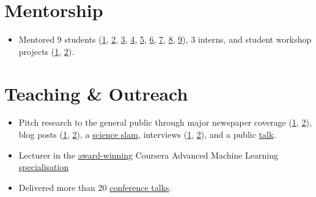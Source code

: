 \documentclass[11pt,a4paper]{article}
\begin{document}
\section{Mentorship}
\begin{itemize}
  \item Mentored 9 students (\href{https://www.hse.ru/edu/vkr/219430466}{1}, \href{https://www.hse.ru/edu/vkr/296294066}{2}, \href{https://www.hse.ru/edu/vkr/219524130}{3}, \href{https://www.hse.ru/en/edu/vkr/470561417}{4}, \href{https://www.hse.ru/en/edu/vkr/470935224}{5}, \href{https://www.hse.ru/ma/datasci/students/diplomas/631565328}{6}, \href{https://www.hse.ru/ma/datasci/students/diplomas/631565422}{7}, \href{https://www.hse.ru/edu/vkr/624890096}{8}, \href{https://www.hse.ru/ba/ami/students/diplomas/834351454}{9}), 3 interns, and student workshop projects (\href{https://sochisirius.ru/news/3148}{1}, \href{https://web.archive.org/web/20220512040654/https://academy.yandex.ru/posts/vossozdat-arkhitekturu-bazy-dannykh-i-nauchit-golosovogo-pomoschnika-predskazyvat-namereniya-polzovatelya}{2}).
\end{itemize}
\section{Teaching \& Outreach}
\begin{itemize}
  \item Pitch research to the general public through major newspaper coverage (\href{https://www.kommersant.ru/doc/7832307}{1}, \href{https://www.kommersant.ru/doc/6122817}{2}), blog posts (\href{https://ifim.nus.edu.sg/tailor-made-2d-materials-became-closer-with-the-new-machine-learning-algorithm-developed-at-nus/}{1}, \href{https://communities.springernature.com/posts/sparse-representation-for-machine-learning-the-properties-of-defects-in-2d-materials}{2}), a \href{https://elementy.ru/events/435506/IV\_Nauchnye\_boi\_NIU\_VShE\_na\_Dne\_Vyshki}{science slam}, interviews (\href{https://web.archive.org/web/20210518043835/https://academy.yandex.ru/posts/beresh-i-razbiraeshsya}{1}, \href{https://habr.com/en/company/yandex/blog/422761/}{2}), and a public \href{https://www.youtube.com/watch?v=zLFZ\_z-7-JI&feature=youtu.be&t=7779}{talk}.
  \item Lecturer in the \href{https://www.hse.ru/en/news/edu/259378493.html}{award-winning} Coursera Advanced Machine Learning \href{https://web.archive.org/web/20220127183223/https://www.coursera.org/specializations/aml}{  specialisation}
  \item Delivered more than 20 \href{https://docs.google.com/document/d/1IOlBse4q0YgEoL\_RCJTvJfbFhFaD\_YMAIJJ3W77B\_X0/edit?usp=sharing}{conference talks}.
\end{itemize}
\end{document}
